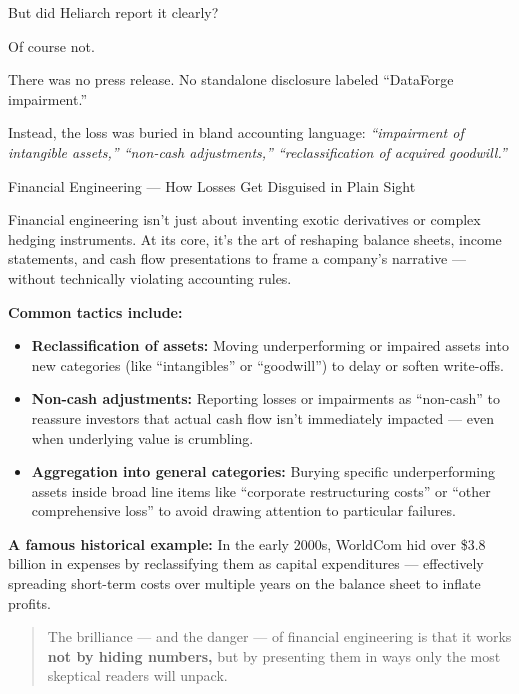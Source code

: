But did Heliarch report it clearly?

Of course not.

There was no press release. No standalone disclosure labeled “DataForge impairment.”

Instead, the loss was buried in bland accounting language:
\textit{“impairment of intangible assets,” “non-cash adjustments,” “reclassification of acquired goodwill.”}

\medskip 

\begin{HistoricalSidebar}{Financial Engineering --- How Losses Get Disguised in Plain Sight}

    Financial engineering isn’t just about inventing exotic derivatives or complex hedging instruments.  
    At its core, it’s the art of reshaping balance sheets, income statements, and cash flow presentations to frame a company’s narrative — without technically violating accounting rules.
    
    \medskip
    
    \textbf{Common tactics include:}

    \medskip
    
    \begin{itemize}
        \item \textbf{Reclassification of assets:} Moving underperforming or impaired assets into new categories (like “intangibles” or “goodwill”) to delay or soften write-offs.
        
        \item \textbf{Non-cash adjustments:} Reporting losses or impairments as “non-cash” to reassure investors that actual cash flow isn’t immediately impacted — even when underlying value is crumbling.
        
        \item \textbf{Aggregation into general categories:} Burying specific underperforming assets inside broad line items like “corporate restructuring costs” or “other comprehensive loss” to avoid drawing attention to particular failures.
    \end{itemize}
    
    \medskip
    
    \textbf{A famous historical example:}  
    In the early 2000s, WorldCom hid over \$3.8 billion in expenses by reclassifying them as capital expenditures — effectively spreading short-term costs over multiple years on the balance sheet to inflate profits.
    
    \begin{quote}
        The brilliance — and the danger — of financial engineering is that it works  
        \textbf{not by hiding numbers,}  
        but by presenting them in ways only the most skeptical readers will unpack.
    \end{quote}
    

\end{HistoricalSidebar}
